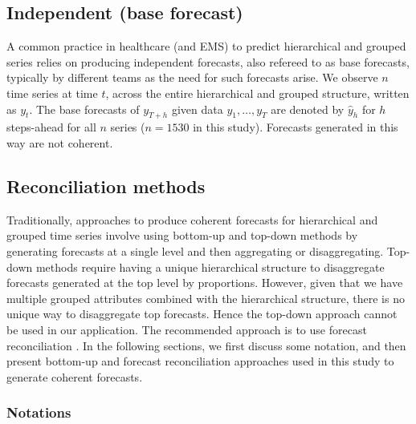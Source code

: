 \documentclass[
  authoryear,
  preprint,
  3p]{elsarticle}
\begin{document}
\hypertarget{independent-base-forecast}{%
\subsection{Independent (base
forecast)}\label{independent-base-forecast}}

A common practice in healthcare (and EMS) to predict hierarchical and
grouped series relies on producing independent forecasts, also refereed
to as base forecasts, typically by different teams as the need for such
forecasts arise. We observe \(n\) time series at time \(t\), across the
entire hierarchical and grouped structure, written as \(y_t\). The base
forecasts of \(y_{T+h}\) given data \(y_1,\dots,y_T\) are denoted by
\(\hat{y}_h\) for \(h\) steps-ahead for all \(n\) series (\(n=1530\) in
this study). Forecasts generated in this way are not coherent.

\hypertarget{reconciliation-methods}{%
\subsection{Reconciliation methods}\label{reconciliation-methods}}

Traditionally, approaches to produce coherent forecasts for hierarchical
and grouped time series involve using bottom-up and top-down methods by
generating forecasts at a single level and then aggregating or
disaggregating. Top-down methods require having a unique hierarchical
structure to disaggregate forecasts generated at the top level by
proportions. However, given that we have multiple grouped attributes
combined with the hierarchical structure, there is no unique way to
disaggregate top forecasts. Hence the top-down approach cannot be used
in our application. The recommended approach is to use forecast
reconciliation \citep{hyndman2011optimal}. In the following sections, we
first discuss some notation, and then present bottom-up and forecast
reconciliation approaches used in this study to generate coherent
forecasts.

\hypertarget{notations}{%
\subsubsection{Notations}\label{notations}}
\end{document}
